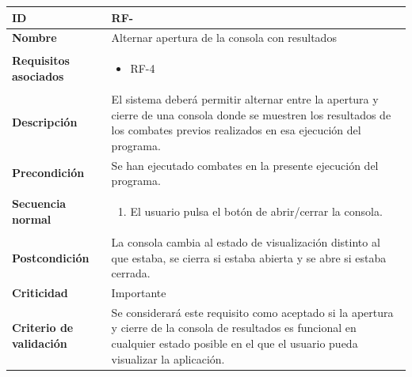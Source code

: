 \begin{center}
	\begin{tabular}{ | p{4.7cm} | p{10cm} | } 
		\hline
		
		\textbf{ID} & RF-\arabic{contador_requisitos_funcionales}
		{contador_requisitos_funcionales} \\
		
		\hline 
		\textbf{Nombre} &
		Alternar apertura de la consola con resultados\\ 
		
		\hline
		\textbf{Requisitos asociados} & 
		\begin{itemize}
			\item RF-4
		\end{itemize}\\
		
		\hline
		\textbf{Descripción} & 
		El sistema deberá permitir alternar entre la apertura y cierre de una consola donde se muestren los resultados de los combates previos realizados en esa ejecución del programa.\\
		
		\hline
		\textbf{Precondición} & 
		Se han ejecutado combates en la presente ejecución del programa.\\
		
		\hline
		\textbf{Secuencia normal} &
		\begin{enumerate}
			\item El usuario pulsa el botón de abrir/cerrar la consola.
		\end{enumerate}
		\\
		
		\hline
		\textbf{Postcondición} & 
		La consola cambia al estado de visualización distinto al que estaba, se cierra si estaba abierta y se abre si estaba cerrada.\\
		
		\hline 
		\textbf{Criticidad} &
		Importante\\
		
		\hline 
		\textbf{Criterio de validación} & 
		Se considerará este requisito como aceptado si la apertura y cierre de la consola de resultados es funcional en cualquier estado posible en el que el usuario pueda visualizar la aplicación.\\
		
		\hline
	\end{tabular}
\end{center}

